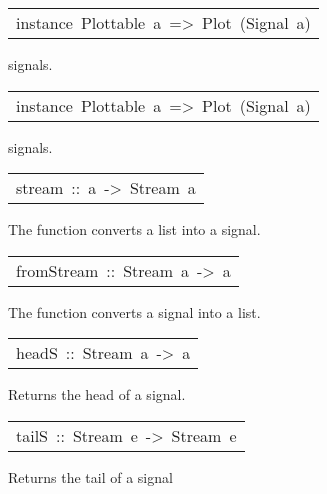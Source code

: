 \begin{haddockdesc}
\item[\begin{tabular}{@{}l}
instance\ Plottable\ a\ =>\ Plot\ (Signal\ a)
\end{tabular}]\haddockbegindoc
{} signals.\par

\end{haddockdesc}
\begin{haddockdesc}
\item[\begin{tabular}{@{}l}
instance\ Plottable\ a\ =>\ Plot\ (Signal\ a)
\end{tabular}]\haddockbegindoc
{} signals.\par

\end{haddockdesc}
\begin{haddockdesc}
\item[\begin{tabular}{@{}l}
stream\ ::\ {\char 91}a{\char 93}\ ->\ Stream\ a
\end{tabular}]\haddockbegindoc
The function  converts a list into a signal.\par

\end{haddockdesc}
\begin{haddockdesc}
\item[\begin{tabular}{@{}l}
fromStream\ ::\ Stream\ a\ ->\ {\char 91}a{\char 93}
\end{tabular}]\haddockbegindoc
The function  converts a signal into a list.\par

\end{haddockdesc}
\begin{haddockdesc}
\item[\begin{tabular}{@{}l}
headS\ ::\ Stream\ a\ ->\ a
\end{tabular}]\haddockbegindoc
Returns the head of a signal.\par

\end{haddockdesc}
\begin{haddockdesc}
\item[\begin{tabular}{@{}l}
tailS\ ::\ Stream\ e\ ->\ Stream\ e
\end{tabular}]\haddockbegindoc
Returns the tail of a signal\par

\end{haddockdesc}
